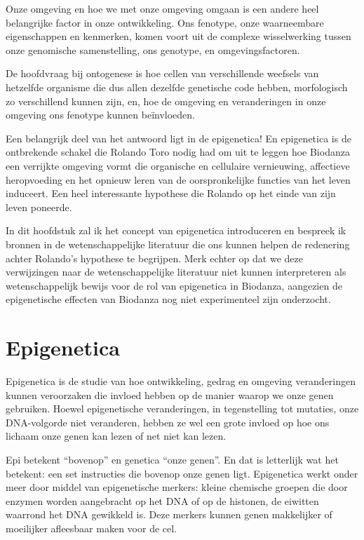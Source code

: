 \documentclass[
  11pt,
]{book}
\begin{document}
Onze omgeving en hoe we met onze omgeving omgaan is een andere heel belangrijke factor in onze ontwikkeling. Ons fenotype, onze waarneembare eigenschappen en kenmerken, komen voort uit de complexe wisselwerking tussen onze genomische samenstelling, ons genotype, en omgevingsfactoren.

De hoofdvraag bij ontogenese is hoe cellen van verschillende weefsels van hetzelfde organisme die dus allen dezelfde genetische code hebben, morfologisch zo verschillend kunnen zijn, en, hoe de omgeving en veranderingen in onze omgeving ons fenotype kunnen beïnvloeden.

Een belangrijk deel van het antwoord ligt in de epigenetica! En epigenetica is de ontbrekende schakel die Rolando Toro nodig had om uit te leggen hoe Biodanza een verrijkte omgeving vormt die organische en cellulaire vernieuwing, affectieve heropvoeding en het opnieuw leren van de oorspronkelijke functies van het leven induceert. Een heel interessante hypothese die Rolando op het einde van zijn leven poneerde.

In dit hoofdstuk zal ik het concept van epigenetica introduceren en bespreek ik bronnen in de wetenschappelijke literatuur die ons kunnen helpen de redenering achter Rolando's hypothese te begrijpen. Merk echter op dat we deze verwijzingen naar de wetenschappelijke literatuur niet kunnen interpreteren als wetenschappelijk bewijs voor de rol van epigenetica in Biodanza, aangezien de epigenetische effecten van Biodanza nog niet experimenteel zijn onderzocht.

\section{Epigenetica}\label{epigenetica}

Epigenetica is de studie van hoe ontwikkeling, gedrag en omgeving veranderingen kunnen veroorzaken die invloed hebben op de manier waarop we onze genen gebruiken. Hoewel epigenetische veranderingen, in tegenstelling tot mutaties, onze DNA-volgorde niet veranderen, hebben ze wel een grote invloed op hoe ons lichaam onze genen kan lezen of net niet kan lezen.

Epi betekent ``bovenop'' en genetica ``onze genen''. En dat is letterlijk wat het betekent: een set instructies die bovenop onze genen ligt. Epigenetica werkt onder meer door middel van epigenetische merkers: kleine chemische groepen die door enzymen worden aangebracht op het DNA of op de histonen, de eiwitten waarrond het DNA gewikkeld is. Deze merkers kunnen genen makkelijker of moeilijker afleesbaar maken voor de cel.
\end{document}
